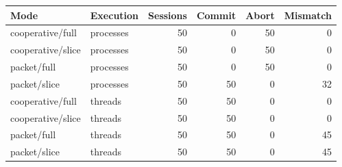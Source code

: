 \begin{tabular}{llrrrr}
\toprule
Mode & Execution & Sessions & Commit & Abort & Mismatch \\
\midrule
cooperative/full & processes & 50 & 0 & 50 & 0 \\
cooperative/slice & processes & 50 & 0 & 50 & 0 \\
packet/full & processes & 50 & 0 & 50 & 0 \\
packet/slice & processes & 50 & 50 & 0 & 32 \\
cooperative/full & threads & 50 & 50 & 0 & 0 \\
cooperative/slice & threads & 50 & 50 & 0 & 0 \\
packet/full & threads & 50 & 50 & 0 & 45 \\
packet/slice & threads & 50 & 50 & 0 & 45 \\
\bottomrule
\end{tabular}
